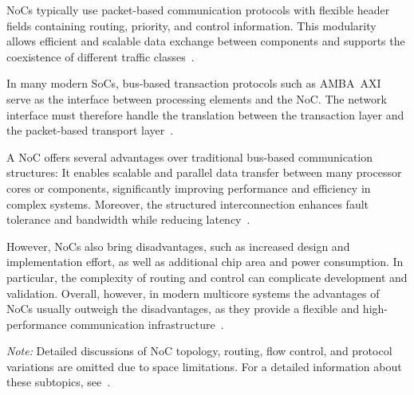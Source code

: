 NoCs typically use packet-based communication protocols with flexible header fields containing routing, priority, and control information. This modularity allows efficient and scalable data exchange between components and supports the coexistence of different traffic classes~\cite{lee_low-power_2006}.

In many modern SoCs, bus-based transaction protocols such as AMBA~AXI serve as the interface between processing elements and the NoC. The network interface must therefore handle the translation between the transaction layer and the packet-based transport layer~\cite{lee_low-power_2006}.
\fi

A \ac{NoC} offers several advantages over traditional bus-based communication structures: It enables scalable and parallel data transfer between many processor cores or components, significantly improving performance and efficiency in complex systems. Moreover, the structured interconnection enhances fault tolerance and bandwidth while reducing latency~\cite{dally_principles_2004}.

However, \acp{NoC} also bring disadvantages, such as increased design and implementation effort, as well as additional chip area and power consumption. In particular, the complexity of routing and control can complicate development and validation. Overall, however, in modern multicore systems the advantages of \acp{NoC} usually outweigh the disadvantages, as they provide a flexible and high-performance communication infrastructure~\cite{dally_principles_2004}.


\noindent\textit{Note:} 
Detailed discussions of NoC topology, routing, flow control, and protocol variations are omitted due to space limitations. 
For a detailed information about these subtopics, see~\cite{dally_principles_2004, unnikrishnan_network_2021, lee_low-power_2006, ma_summary_2024, hu_dyad_2004, fang_parrouting_2020, luneque_routing_2013}.
